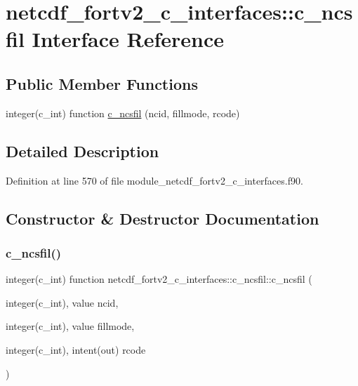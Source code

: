 \hypertarget{interfacenetcdf__fortv2__c__interfaces_1_1c__ncsfil}{}\section{netcdf\+\_\+fortv2\+\_\+c\+\_\+interfaces\+:\+:c\+\_\+ncsfil Interface Reference}
\label{interfacenetcdf__fortv2__c__interfaces_1_1c__ncsfil}
\subsection*{Public Member Functions}
\begin{DoxyCompactItemize}
\item 
integer(c\+\_\+int) function \hyperlink{interfacenetcdf__fortv2__c__interfaces_1_1c__ncsfil_a8bfba194b15c225ceda034758b579fdb}{c\+\_\+ncsfil} (ncid, fillmode, rcode)
\end{DoxyCompactItemize}


\subsection{Detailed Description}


Definition at line 570 of file module\+\_\+netcdf\+\_\+fortv2\+\_\+c\+\_\+interfaces.\+f90.



\subsection{Constructor \& Destructor Documentation}
\mbox{\label{interfacenetcdf__fortv2__c__interfaces_1_1c__ncsfil_a8bfba194b15c225ceda034758b579fdb}} 
\subsubsection{\texorpdfstring{c\+\_\+ncsfil()}{c\_ncsfil()}}
{\footnotesize\ttfamily integer(c\+\_\+int) function netcdf\+\_\+fortv2\+\_\+c\+\_\+interfaces\+::c\+\_\+ncsfil\+::c\+\_\+ncsfil (\begin{DoxyParamCaption}\item[{integer(c\+\_\+int), value}]{ncid,  }\item[{integer(c\+\_\+int), value}]{fillmode,  }\item[{integer(c\+\_\+int), intent(out)}]{rcode }\end{DoxyParamCaption})}



